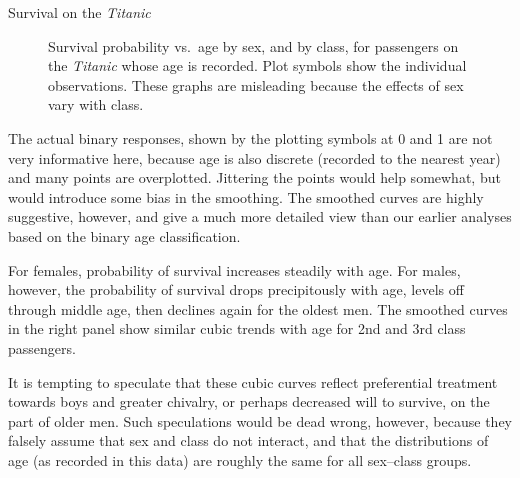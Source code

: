 \begin{Example}[titanic4]{Survival on the \emph{Titanic}}
\begin{figure}[htb]
\begin{minipage}[t]{.49\linewidth}
 \end{minipage}
 \caption[Survival probability vs.\  age by sex (left), and by class (right), for passengers on the \emph{Titanic}]{Survival probability vs.\  age by sex, and by class, for passengers on the \emph{Titanic} whose age is recorded.
 Plot symbols show the individual observations.  These graphs are misleading because the effects of sex vary with class.}\label{fig:psurvive12}
\end{figure}

The actual binary responses, shown by the plotting symbols at
0 and 1 are not very informative here, because age is also discrete
(recorded to the nearest year) and many points are
overplotted.
Jittering the points would help somewhat, but would introduce some bias in
the smoothing.
The smoothed curves are highly suggestive, however,
and give a much more detailed view than our earlier analyses based
on the binary age classification.

For females, probability of survival increases steadily with age.
For males, however, the probability of survival drops precipitously with
age, levels off through middle age, then declines again for the
oldest men.
The smoothed curves in the right panel show similar cubic trends
with age for 2nd and 3rd class passengers.

It is tempting to speculate that these cubic curves reflect
preferential treatment towards boys and
greater chivalry, or perhaps decreased will to survive, on the part of
older men.
Such speculations would be dead wrong, however,
because they falsely assume that sex and class do not interact,
and that the distributions of age (as recorded in this data)
are roughly the same for all sex--class groups.


\end{Example}
